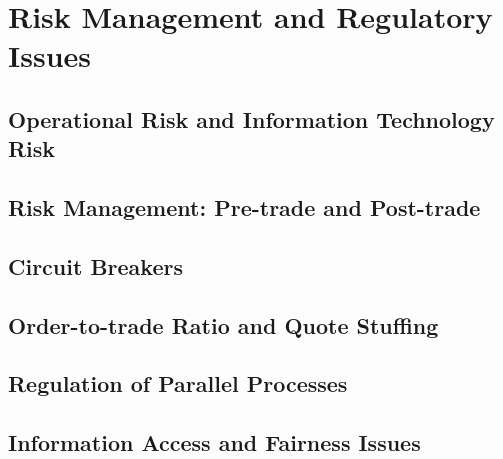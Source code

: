 \chapter{Risk Management and Regulatory Issues\label{chap:risk_man_regissue}}

\section{Operational Risk and Information Technology Risk}
\section{Risk Management:  Pre-trade and Post-trade}
\section{Circuit Breakers}
\section{Order-to-trade Ratio and Quote Stuffing}
\section{Regulation of Parallel Processes}
\section{Information Access and Fairness Issues}